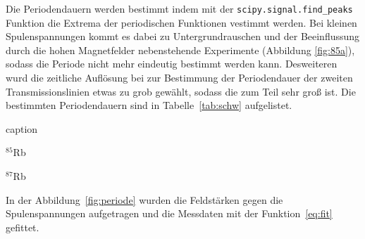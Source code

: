 Die Periodendauern werden bestimmt indem mit der \texttt{scipy.signal.find\_peaks}
Funktion die Extrema der periodischen Funktionen vestimmt werden. 
Bei kleinen Spulenspannungen kommt es dabei zu Untergrundrauschen und der
Beeinflussung durch die hohen Magnetfelder nebenstehende Experimente (Abbildung
\ref{fig:85a}), sodass die Periode nicht mehr eindeutig bestimmt werden kann. 
Desweiteren wurd die zeitliche Auflösung bei zur Bestimmung der Periodendauer
der zweiten Transmissionslinien etwas zu grob gewählt, sodass die zum Teil sehr
groß ist.
Die bestimmten Periodendauern sind in Tabelle~\ref{tab:schw} aufgelistet.
\begin{table}[h]
	\centering
	\caption{caption}
	\label{tab:schw}
	\begin{subtable}[t]{0.4\textwidth}
	\centering
	\caption{$^{85}$Rb}
		
	\end{subtable}
	\begin{subtable}[t]{0.4\textwidth}
	\centering
	\caption{$^{87}$Rb}
		
	\end{subtable}
\end{table}
In der Abbildung~\ref{fig:periode} wurden die Feldstärken gegen die Spulenspannungen
aufgetragen und die Messdaten mit der Funktion~\ref{eq:fit} gefittet.
